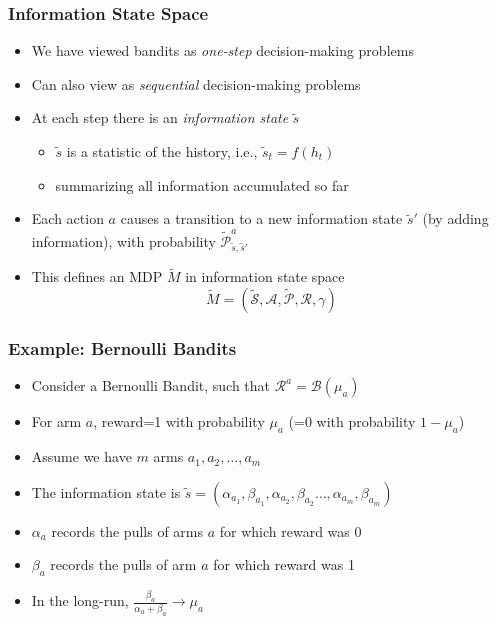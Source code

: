 \documentclass[handout]{beamer}
\begin{document}
\begin{frame}
\frametitle{Information State Space}
\pause
\begin{itemize}[<+->]
\item We have viewed bandits as {\em one-step} decision-making problems
\item Can also view as {\em sequential} decision-making problems
\item At each step there is an {\em information state} $\tilde{s}$
\begin{itemize}
\item $\tilde{s}$ is a statistic of the history, i.e., $\tilde{s}_t = f(h_t)$
\item summarizing all information accumulated so far
\end{itemize}
\item Each action $a$ causes a transition to a new information state $\tilde{s}'$ (by adding information), with probability $\tilde{\mathcal{P}}_{\tilde{s},\tilde{s}'}^a$
\item This defines an MDP $\tilde{M}$ in information state space
$$\tilde{M} = (\tilde{\mathcal{S}}, \mathcal{A}, \tilde{\mathcal{P}}, \mathcal{R}, \gamma)$$
\end{itemize}
\end{frame}

\begin{frame}
\frametitle{Example: Bernoulli Bandits}
\pause
\begin{itemize}[<+->]
\item Consider a Bernoulli Bandit, such that $\mathcal{R}^a = \mathcal{B}(\mu_a)$
\item For arm $a$, reward=1 with probability $\mu_a$ (=0 with probability $1-\mu_a$)
\item Assume we have $m$ arms $a_1, a_2, \ldots, a_m$
\item The information state is $\tilde{s} = (\alpha_{a_1}, \beta_{a_1}, \alpha_{a_2}, \beta_{a_2}\ldots, \alpha_{a_m}, \beta_{a_m})$
\item $\alpha_a$ records the pulls of arms $a$  for which reward was 0
\item $\beta_a$ records the pulls of arm $a$ for which reward was 1
\item In the long-run, $\frac {\beta_a} {\alpha_a + \beta_a} \rightarrow \mu_a$
\end{itemize}
\end{frame}
\end{document}
